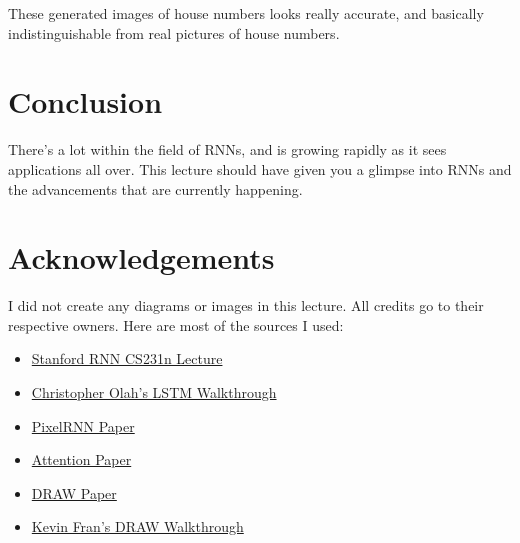 \documentclass{article}
\begin{document}
These generated images of house numbers looks really accurate, and basically indistinguishable from real pictures of house numbers.

\section{Conclusion}
There's a lot within the field of RNNs, and is growing rapidly as it sees applications all over. This lecture should have given you a glimpse into RNNs and the advancements that are currently happening.

\section{Acknowledgements}

I did not create any diagrams or images in this lecture. All credits go to their respective owners. Here are most of the sources I used:

\begin{itemize}
    \item \href{http://www.youtube.com/watch?v=6niqTuYFZLQ}{Stanford RNN CS231n Lecture}
    
    \item \href{http://colah.github.io/posts/2015-08-Understanding-LSTMs/}{Christopher Olah's LSTM Walkthrough}
    
    \item \href{https://arxiv.org/pdf/1601.06759v2.pdf}{PixelRNN Paper}
    
    \item \href{https://arxiv.org/pdf/1502.03044.pdf}{Attention Paper}
    
    \item \href{https://arxiv.org/pdf/1502.04623.pdf}{DRAW Paper}
    
    \item \href{http://kvfrans.com/what-is-draw-deep-recurrent-attentive-writer/}{Kevin Fran's DRAW Walkthrough}

\end{itemize}
\end{document}

